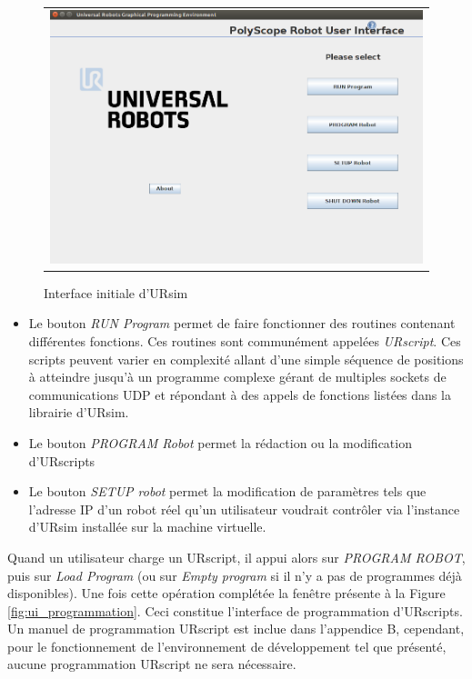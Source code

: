 \documentclass[root.tex]{subfiles}
\begin{document}
\begin{figure}
 \begin{center}
  \begin{tabular}{c}
    \includegraphics[trim=0cm 0cm 0cm 0cm, scale=0.4]{screenshots_tuto_ursim/interface_init.png}
  \end{tabular}
 \end{center}
\caption{Interface initiale d'URsim}
 \label{fig:ui_start}
\end{figure}

\begin{itemize}
\item Le bouton \textit{RUN Program} permet de faire fonctionner des routines contenant différentes fonctions. Ces routines sont communément appelées \textit{URscript}. Ces scripts peuvent varier en complexité allant d'une simple séquence de positions à atteindre jusqu'à un programme complexe gérant de multiples sockets de communications UDP et répondant à des appels de fonctions listées dans la librairie d'URsim.
\item Le bouton \textit{PROGRAM Robot} permet la rédaction ou la modification d'URscripts
\item Le bouton \textit{SETUP robot} permet la modification de paramètres tels que l'adresse IP d'un robot réel qu'un utilisateur voudrait contrôler via l'instance d'URsim installée sur la machine virtuelle.
\end{itemize}

Quand un utilisateur charge un URscript, il appui alors sur \textit{PROGRAM ROBOT}, puis sur \textit{Load Program} (ou sur \textit{Empty program} si il n'y a pas de programmes déjà disponibles). Une fois cette opération complétée la fenêtre présente à la Figure \ref{fig:ui_programmation}. Ceci constitue l'interface de programmation d'URscripts. Un manuel de programmation URscript est inclue dans l'appendice B, cependant, pour le fonctionnement de l'environnement de développement tel que présenté, aucune programmation URscript ne sera nécessaire.
\end{document}
